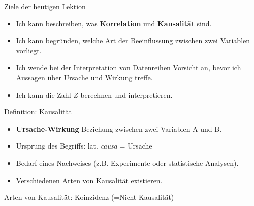 \begin{frame}[fragile]{Ziele der heutigen Lektion}
    \begin{itemize}[<+->]
        \item \faSquare{} Ich kann beschreiben, was \textbf{Korrelation} und \textbf{Kausalität} sind.
        \item \faSquare{} Ich kann begründen, welche Art der Beeinflussung zwischen zwei Variablen vorliegt.
        \item \faSquare{} Ich wende bei der Interpretation von Datenreihen Vorsicht an, bevor ich Aussagen über Ursache und Wirkung treffe.
        \item \faSquare{} Ich kann die Zahl \( Z \) berechnen und interpretieren.
    \end{itemize}
\end{frame}

\begin{frame}{Definition: Kausalität}
    \begin{mydefinition}[Kausalität]
    \begin{itemize}[<+->]
        \item \textbf{Ursache-Wirkung}-Beziehung zwischen zwei Variablen A und B.
        \item Ursprung des Begriffs: lat. \textit{causa} = Ursache
        \item Bedarf eines Nachweises (z.B. Experimente oder statistische Analysen).
        \item Verschiedenen Arten von Kausalität existieren.
    \end{itemize}
    \end{mydefinition}
\end{frame}

\begin{frame}{Arten von Kausalität: Koinzidenz (=Nicht-Kausalität)}
    \begin{center}
    \end{center}
\end{frame}

